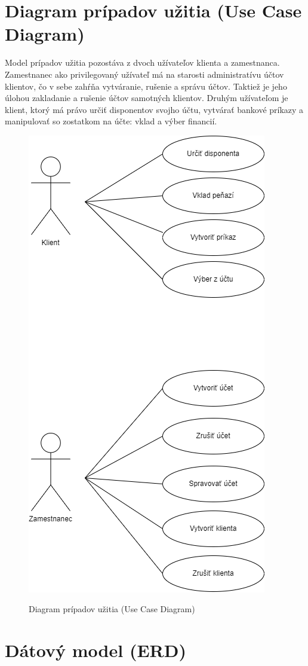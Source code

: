 \documentclass[a4paper, 11pt, report]{article}
\begin{document}
    
    \newpage
    
    
    \section{Diagram prípadov užitia (Use Case Diagram)}
   
    Model prípadov užitia pozostáva z dvoch užívateľov klienta a zamestnanca. Zamestnanec ako privilegovaný užívateľ má na starosti administratívu účtov klientov, čo v sebe zahŕňa vytváranie, rušenie a správu účtov. Taktiež je jeho úlohou zakladanie a rušenie účtov samotných klientov. Druhým užívateľom je klient, ktorý má právo určiť disponentov svojho účtu, vytvárať bankové príkazy a manipulovať so zostatkom na účte: vklad a výber financií.
    
    \bigskip
    \begin{figure}[ht]
        \centering
        \includegraphics[width=0.50 \linewidth]{UseCase.png}\\
        \caption{Diagram prípadov užitia (Use Case Diagram)}
    \end{figure}
    
    \newpage
    
    
    \section{Dátový model (ERD)}
    
\end{document}

